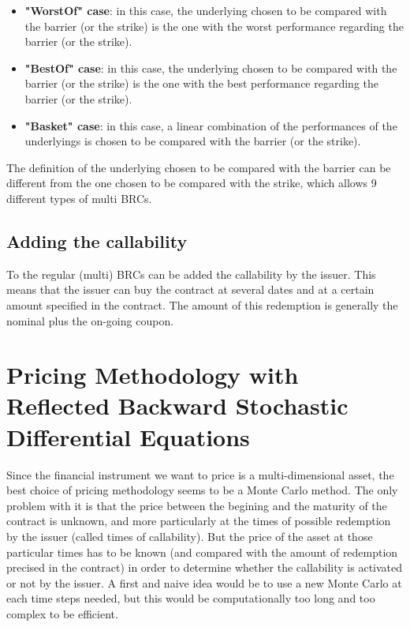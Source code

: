 \documentclass[a4paper,11pt,english]{book}
\begin{document}
\begin{itemize}
    \item \textbf{"WorstOf" case}: in this case, the underlying chosen to be compared with the barrier (or the strike) is the one with the worst performance regarding the barrier (or the strike).
    \item \textbf{"BestOf" case}: in this case, the underlying chosen to be compared with the barrier (or the strike) is the one with the best performance regarding the barrier (or the strike).
    \item \textbf{"Basket" case}: in this case, a linear combination of the performances of the underlyings is chosen to be compared with the barrier (or the strike).
\end{itemize}

The definition of the underlying chosen to be compared with the barrier can be different from the one chosen to be compared with the strike, which allows 9 different types of multi BRCs.

\section{Adding the callability}
To the regular (multi) BRCs can be added the callability by the issuer. This means that the issuer can buy the contract at several dates and at a certain amount specified in the contract. The amount of this redemption is generally the nominal plus the on-going coupon.


\pagestyle{fancy}

\chapter{Pricing Methodology with Reflected Backward Stochastic Differential Equations}
\label{chap:pricing-methodology}
Since the financial instrument we want to price is a multi-dimensional asset, the best choice of pricing methodology seems to be a Monte Carlo method. The only problem with it is that the price between the begining and the maturity of the contract is unknown, and more particularly at the times of possible redemption by the issuer (called times of callability). But the price of the asset at those particular times has to be known (and compared with the amount of redemption precised in the contract) in order to determine whether the callability is activated or not by the issuer. A first and naive idea would be to use a new Monte Carlo at each time steps needed, but this would be computationally too long and too complex to be efficient.  
\end{document}
